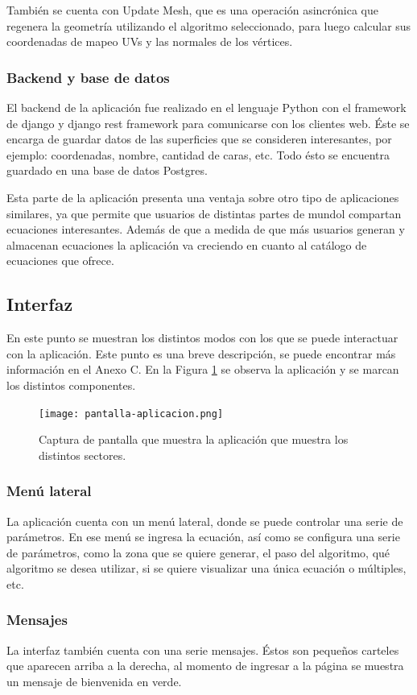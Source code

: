 \documentclass[12pt]{article}
\begin{document}
También se cuenta con Update Mesh, que es una operación asincrónica que regenera la geometría utilizando el algoritmo seleccionado, para luego calcular sus coordenadas de mapeo UVs y las normales de los vértices.
\subsubsection{Backend y base de datos}
\noindent El backend de la aplicación fue realizado en el lenguaje Python con el framework de django y django rest framework para comunicarse con los clientes web. Éste se encarga de guardar datos de las superficies que se consideren interesantes, por ejemplo: coordenadas, nombre, cantidad de caras, etc. Todo ésto se encuentra guardado en una base de datos Postgres.

Esta parte de la aplicación presenta una ventaja sobre otro tipo de aplicaciones similares, ya que permite que usuarios de distintas partes de mundol compartan ecuaciones interesantes. Además de que a medida de que más usuarios generan y almacenan ecuaciones la aplicación va creciendo en cuanto al catálogo de ecuaciones que ofrece.
\clearpage
\subsection{Interfaz}
\noindent En este punto se muestran los distintos modos con los que se puede interactuar con la aplicación. Este punto es una breve descripción, se puede encontrar más información en el Anexo C. En la Figura \ref{pantalla} se observa la aplicación y se marcan los distintos componentes.

\begin{figure}[h]
\texttt{[image: pantalla-aplicacion.png]}
\caption{Captura de pantalla que muestra la aplicación que muestra los distintos sectores.}
\label{pantalla}
\end{figure}

\subsubsection{Menú lateral}
\noindent La aplicación cuenta con un menú lateral, donde se puede controlar una serie de parámetros. En ese menú se ingresa la ecuación, así como se configura una serie de parámetros, como la zona que se quiere generar, el paso del algoritmo, qué algoritmo se desea utilizar, si se quiere visualizar una única ecuación o múltiples, etc. 
\subsubsection{Mensajes}
\noindent La interfaz también cuenta con una serie mensajes. Éstos son pequeños carteles que aparecen arriba a la derecha, al momento de ingresar a la página se muestra un mensaje de bienvenida en verde. 
\end{document}
